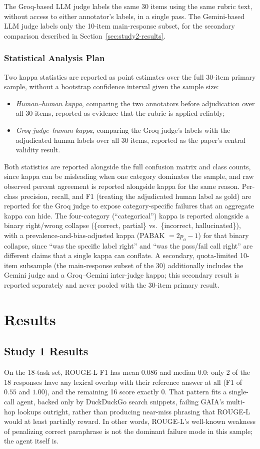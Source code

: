 \documentclass[conference]{IEEEtran}
\begin{document}
The Groq-based LLM judge labels the same 30 items using the same rubric text, without access to either annotator's labels, in a single pass. The Gemini-based LLM judge labels only the 10-item main-response subset, for the secondary comparison described in Section~\ref{sec:study2-results}.

\subsubsection{Statistical Analysis Plan}
Two kappa statistics are reported as point estimates over the full 30-item primary sample, without a bootstrap confidence interval given the sample size:
\begin{itemize}
\item \emph{Human--human kappa}, comparing the two annotators before adjudication over all 30 items, reported as evidence that the rubric is applied reliably;
\item \emph{Groq judge--human kappa}, comparing the Groq judge's labels with the adjudicated human labels over all 30 items, reported as the paper's central validity result.
\end{itemize}
Both statistics are reported alongside the full confusion matrix and class counts, since kappa can be misleading when one category dominates the sample, and raw observed percent agreement is reported alongside kappa for the same reason. Per-class precision, recall, and F1 (treating the adjudicated human label as gold) are reported for the Groq judge to expose category-specific failures that an aggregate kappa can hide. The four-category (``categorical'') kappa is reported alongside a binary right/wrong collapse (\{correct, partial\} vs.\ \{incorrect, hallucinated\}), with a prevalence-and-bias-adjusted kappa (PABAK $=2p_o-1$) for that binary collapse, since ``was the specific label right'' and ``was the pass/fail call right'' are different claims that a single kappa can conflate. A secondary, quota-limited 10-item subsample (the main-response subset of the 30) additionally includes the Gemini judge and a Groq--Gemini inter-judge kappa; this secondary result is reported separately and never pooled with the 30-item primary result.

\section{Results}
\label{sec:results}
\subsection{Study 1 Results}
On the 18-task set, ROUGE-L F1 has mean $0.086$ and median $0.0$: only 2 of the 18 responses have any lexical overlap with their reference answer at all (F1 of $0.55$ and $1.00$), and the remaining 16 score exactly $0$. That pattern fits a single-call agent, backed only by DuckDuckGo search snippets, failing GAIA's multi-hop lookups outright, rather than producing near-miss phrasing that ROUGE-L would at least partially reward. In other words, ROUGE-L's well-known weakness of penalizing correct paraphrase is not the dominant failure mode in this sample; the agent itself is.
\end{document}
